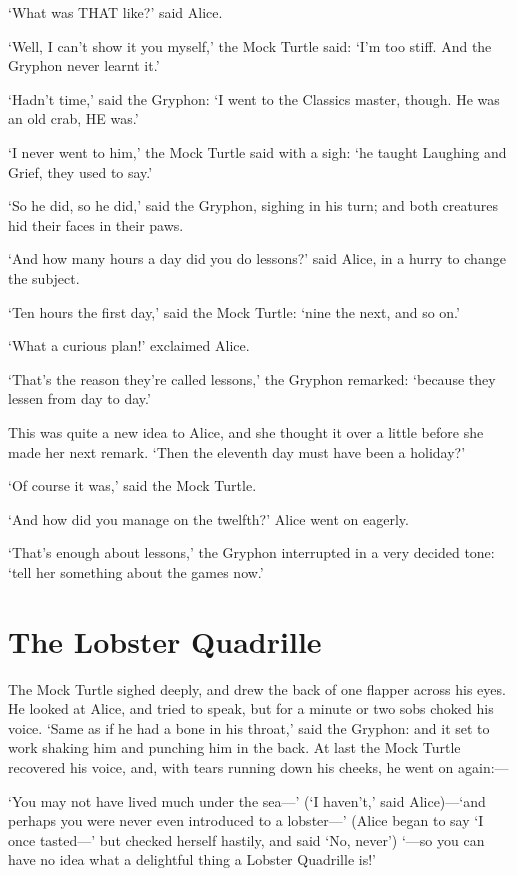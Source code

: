 \documentclass[12pt]{book}
\begin{document}
\begin{Parallel}[p]{}{}
{‘What was THAT like?’ said Alice.

‘Well, I can’t show it you myself,’ the Mock Turtle said: ‘I’m too stiff. And the Gryphon never learnt it.’

‘Hadn’t time,’ said the Gryphon: ‘I went to the Classics master, though. He was an old crab, HE was.’

‘I never went to him,’ the Mock Turtle said with a sigh: ‘he taught Laughing and Grief, they used to say.’

‘So he did, so he did,’ said the Gryphon, sighing in his turn; and both creatures hid their faces in their paws.

‘And how many hours a day did you do lessons?’ said Alice, in a hurry to change the subject.

‘Ten hours the first day,’ said the Mock Turtle: ‘nine the next, and so on.’

‘What a curious plan!’ exclaimed Alice.

‘That’s the reason they’re called lessons,’ the Gryphon remarked: ‘because they lessen from day to day.’

This was quite a new idea to Alice, and she thought it over a little before she made her next remark. ‘Then the eleventh day must have been a holiday?’

‘Of course it was,’ said the Mock Turtle.

‘And how did you manage on the twelfth?’ Alice went on eagerly.

‘That’s enough about lessons,’ the Gryphon interrupted in a very decided tone: ‘tell her something about the games now.’




\section{The Lobster Quadrille}

The Mock Turtle sighed deeply, and drew the back of one flapper across his eyes. He looked at Alice, and tried to speak, but for a minute or two sobs choked his voice. ‘Same as if he had a bone in his throat,’ said the Gryphon: and it set to work shaking him and punching him in the back. At last the Mock Turtle recovered his voice, and, with tears running down his cheeks, he went on again:—

‘You may not have lived much under the sea—’ (‘I haven’t,’ said Alice)—‘and perhaps you were never even introduced to a lobster—’ (Alice began to say ‘I once tasted—’ but checked herself hastily, and said ‘No, never’) ‘—so you can have no idea what a delightful thing a Lobster Quadrille is!’

}
\end{Parallel}
\end{document}

